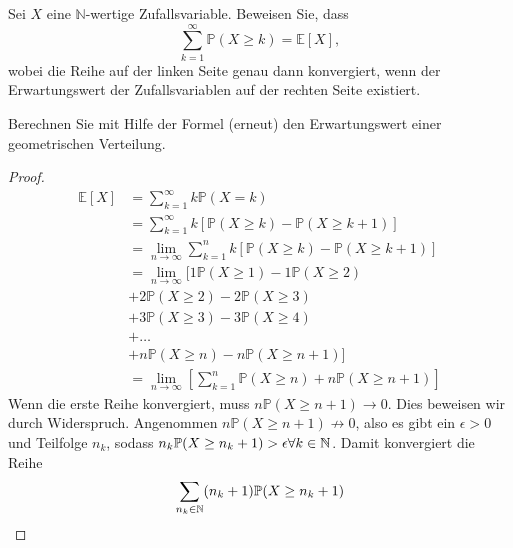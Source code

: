 \begin{Problem}
	Sei \( X \) eine \( \mathbb{N} \)-wertige Zufallsvariable. Beweisen Sie, dass
	\[
	\sum_{k=1}^\infty \mathbb{P}(X \geq k) = \mathbb{E}[X],
	\]
	wobei die Reihe auf der linken Seite genau dann konvergiert, wenn der Erwartungswert der Zufallsvariablen auf der rechten Seite existiert. 
	
	Berechnen Sie mit Hilfe der Formel (erneut) den Erwartungswert einer geometrischen Verteilung.
\end{Problem}
\begin{proof}
	\begin{align*}
		\mathbb{E}[X] &= \sum_{k=1}^\infty k \mathbb{P}(X = k)\\
		&=\sum_{k=1}^\infty k [\mathbb{P}(X \ge k ) - \mathbb{P}(X \ge k+1)]\\
		&=\lim_{n\to \infty}\sum_{k=1}^n k [\mathbb{P}(X \ge k) - \mathbb{P}(X \ge k+1)]\\
		&=\lim_{n\to \infty}[1\mathbb{P}(X\ge 1) - 1\mathbb{P}(X \ge 2)\\
		&+2\mathbb{P}(X \ge 2) - 2\mathbb{P}(X \ge 3)\\
		&+3\mathbb{P}(X \ge 3) - 3\mathbb{P}(X \ge 4)\\
		&+\dots\\
		&+n\mathbb{P}(X \ge n) - n \mathbb{P}(X \ge n +1)]\\
		&=\lim_{n\to \infty} \left[\sum_{k=1}^n \mathbb{P}(X \ge n)+ n \mathbb{P}(X \ge n + 1)\right]
	\end{align*}
Wenn die erste Reihe konvergiert, muss $n\mathbb{P}(X \ge n+1)\to 0$. Dies beweisen wir durch Widerspruch. Angenommen $n \mathbb{P}(X \ge n + 1)\not\to 0$, also es gibt ein $\epsilon>0$ und Teilfolge $n_k$, sodass $n_k\mathbb{P}(X \ge n_k + 1)>\epsilon\forall k\in \mathbb{N}$. Damit konvergiert die Reihe
\[\sum_{n_k\in \mathbb{N} }(n_k + 1)\mathbb{P}(X \ge n_k+1)\]
\end{proof}